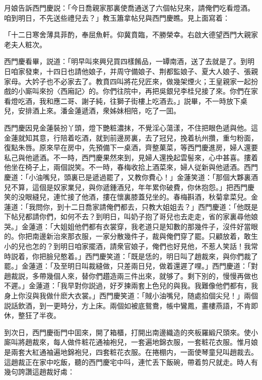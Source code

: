 月娘告訴西門慶説：「今日喬親家那裏使喬通送了六個帖兒來，請俺們吃看燈酒。咱到明日，不先送些禮兒去？」教玉簫拿帖兒與西門慶瞧。見上面寫着：

\begin{myquote}[\markfont]
「十二日寒舍薄具菲酌，奉屈魚軒。仰冀賁臨，不勝榮幸。右啟大德望西門大親家老夫人粧次。

\end{myquote}

西門慶看畢，説道：「明早叫來興兒買四樣餚品，一罈南酒，送了去就是了。到明日咱家發柬，十四日也請他娘子，并周守備娘子、荆都監娘子、夏大人娘子、張親家母。大妗子也不必家去了。教賁四叫將花兒匠來，做幾架煙火；王皇親家一起扮戲的小廝叫來扮〈西廂記〉的。你們往院中，再把吳銀兒李桂兒接了來。你們在家看燈吃酒，我和應二哥、謝子純，往獅子街樓上吃酒去。」説畢，不一時放下桌兒，安排酒上來。潘金蓮遞酒，衆姊妹相陪，吃了一囬。

西門慶因見金蓮裝扮丫頭，燈下艷粧濃抹，不覺淫心蕩漾，不住把眼色遞與他。這金蓮就知其意，行陪着吃酒，就到前邊房裏，去了冠兒，挽着杭州攢，重勻粉面，復點朱唇。原來早在房中，先預備下一桌酒，齊整菓菜，等西門慶進房，婦人還要私己與他遞酒。不一時，西門慶果然來到，見婦人還挽起雲髻來，心中甚喜。摟着他坐在椅子上，兩個説笑。不一時，春梅收拾上酒菜來，婦人従新與他遞酒。西門慶道：「小油嘴兒，頭裏已是遞過罷了，又教你費心！」金蓮笑道：「那個大夥裏酒兒不算，這個是奴家業兒，與你遞鍾酒兒，年年累你破費，你休抱怨。」把西門慶笑的没眼縫兒，連忙接了他酒，摟在懷裏膝蓋兒坐的。春梅斟酒，秋菊拿菜兒。金蓮道：「我問你，到十二日喬家請俺們都去，只教大姐姐去？」西門慶道：「他既是下帖兒都請你們，如何不去？到明日，叫奶子抱了哥兒也去走走，省的家裏尋他娘哭。」金蓮道：「大姐姐他們都有衣裳穿，我老道只是知數的那幾件子，沒件好當眼的。你把南邊新治來那衣服，一家分散幾件子，裁與俺們穿了罷。只顧放着，敢生小的兒也怎的？到明日咱家擺酒，請衆官娘子，俺們也好見他，不惹人笑話！我常時説着，你把臉兒憨着。」西門慶笑道：「既是恁的，明日叫了趙裁來，與你們裁了罷。」金蓮道：「及至明日叫裁縫做，只差兩日兒，做着還遲了哩。」西門慶道：「對趙裁説，多帶幾個人來，替你們趲造兩三件出來，就够了。剩下別的，慢慢再做也不遲。」金蓮道：「我早對你説過，好歹揀兩套上色兒的與我。我難像他們都有，我身上你沒與我做什麽大衣裳。」西門慶笑道：「賊小油嘴兒，随處掐個尖兒！」兩個説話飲酒，到一更時分，方上床。兩個如被底鴛鴦，帳中鸞鳳，畫樓燕語，不肯即休，整狂了半夜。

到次日，西門慶衙門中囬來，開了箱櫃，打開出南邊織造的夾板羅緞尺頭來。使小廝叫將趙裁來，每人做件粧花通袖袍兒，一套遍地錦衣服，一套粧花衣服。惟月娘是兩套大紅通袖遍地錦袍兒，四套粧花衣服。在捲棚内，一面使琴童兒叫趙裁去。這趙裁正在家中吃飯，聽的西門慶宅中呌，連忙丢下飯碗，帶着剪尺就走。時人有幾句誇讚這趙裁好䖏：

